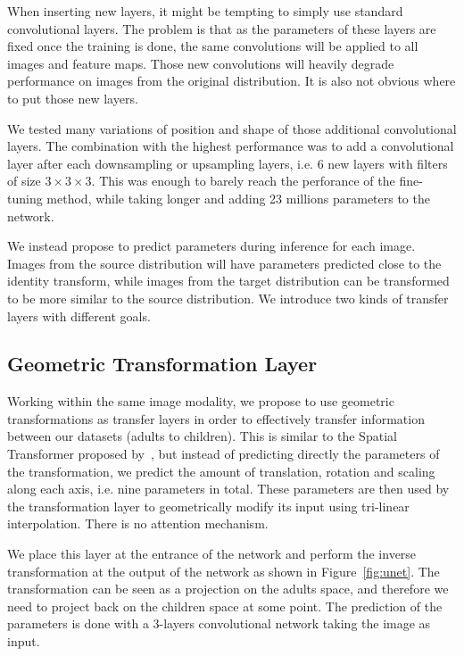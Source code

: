 When inserting new layers, it might be tempting to simply use standard convolutional layers. The problem is that as the parameters of these layers are fixed once the training is done, the same convolutions will be applied to all images and feature maps. Those new convolutions will heavily degrade performance on images from the original distribution. It is also not obvious where to put those new layers. 

We tested many variations of position and shape of those additional convolutional layers. The combination with the highest performance was to add a convolutional layer after each downsampling or upsampling layers, i.e. 6 new layers with filters of size $3 \times 3 \times 3$. This was enough to barely reach the perforance of the fine-tuning method, while taking longer and adding 23 millions parameters to the network. 

We instead propose to predict parameters during inference for each image. Images from the source distribution will have parameters predicted close to the identity transform, while images from the target distribution can be transformed to be more similar to the source distribution. We introduce two kinds of transfer layers with different goals.


\subsection{Geometric Transformation Layer}
\label{ssec:geo_transfo}

Working within the same image modality, we propose to use geometric transformations as transfer layers in order to effectively transfer information between our datasets (adults to children). This is similar to the Spatial Transformer proposed by~\textcite{jaderberg2015NIPS}, but instead of predicting directly the parameters of the transformation, we predict the amount of translation, rotation and scaling along each axis, i.e. nine parameters in total. These parameters are then used by the transformation layer to geometrically modify its input using tri-linear interpolation. There is no attention mechanism.

We place this layer at the entrance of the network and perform the inverse transformation at the output of the network as shown in Figure~\ref{fig:unet}. The transformation can be seen as a projection on the adults space, and therefore we need to project back on the children space at some point. The prediction of the parameters is done with a 3-layers convolutional network taking the image as input.

